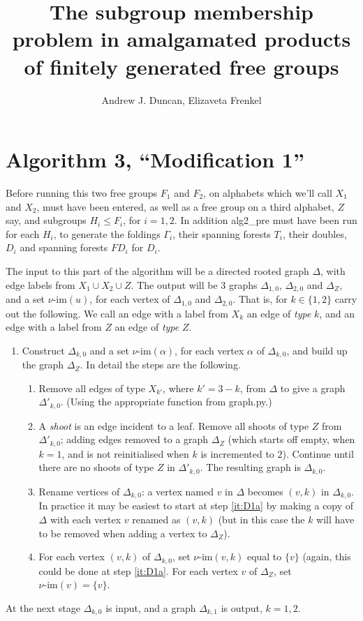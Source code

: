 \documentclass[a4paper,12pt]{article}
\title{The subgroup membership problem in amalgamated products of 
finitely generated free groups
}
\author{Andrew J. Duncan, Elizaveta Frenkel}
\renewcommand{\a}{\alpha }
\newcommand{\G}{\Gamma }
\newcommand{\D}{\Delta }
\newcommand{\vim}{\nu\textrm{-im}}
\numberwithin{equation}{section}
\numberwithin{figure}{section}
\newcommand{\be}{\begin{enumerate}}
\newcommand{\ee}{\end{enumerate}}
\begin{document}
\section{Algorithm 3, ``Modification 1''}
Before running this two free groups $F_1$ and $F_2$, on alphabets which we'll call
$X_1$ and $X_2$, must have been entered, as well as a free group on a third alphabet,
$Z$ say, and subgroups $H_i\le F_i$, for $i=1,2$. In addition alg2\_pre must have
been run for each $H_i$, to generate  the foldings $\G_i$, their spanning forests
$T_i$, their doubles, $D_i$ and spanning forests $FD_i$ for $D_i$. 

The input to this part of the algorithm will be a directed rooted 
graph $\D$, with edge labels from $X_1\cup X_2\cup Z$. The output
will be 3 graphs $\D_{1,0}$, $\D_{2,0}$ and $\D_Z$, and 
a set $\vim(u)$, for each vertex of $\D_{1,0}$ and $\D_{2,0}$. That is, for  $k\in \{1,2\}$ carry out the following. We call an edge with a label from $X_k$ an edge of \emph{type} $k$, and an edge with a label from $Z$ an edge
of \emph{type} $Z$. 
\be[{D}1]
\item\label{it:D1} Construct $\D_{k,0}$ and   
a set $\vim(\a)$, for each vertex  $\a$ of $\D_{k,0}$, and build up
the graph $\D_Z$. In detail the steps are
the following. 
\be 
\item\label{it:D1a} Remove all edges of type $X_{k'}$, where $k'=3-k$, from $\D$ to give a graph $\D'_{k,0}$. (Using the appropriate function from  graph.py.)
\item\label{it:D1b} A \emph{shoot} is an edge incident to a leaf. Remove all shoots
of type $Z$ from $\D'_{k,0}$; adding 
edges removed to  a graph $\D_Z$ (which starts off empty, when $k=1$, and  
is not reinitialised when $k$ is incremented to $2$). Continue 
until there are no shoots of type $Z$ in $\D'_{k,0}$.  The resulting graph
is $\D_{k,0}$.  
\item\label{it:D1c}  Rename vertices of $\D_{k,0}$: 
a vertex named $v$  in $\D$ becomes
$(v,k)$ in $\D_{k,0}$. In practice it may be easiest to start at 
step \ref{it:D1a} by making a copy of $\D$ with each vertex $v$ renamed
as $(v,k)$ (but in this case the $k$ will have to be removed when
adding a vertex to $\D_Z$). 
\item\label{it:D1d} For each  vertex $(v,k)$  of $\D_{k,0}$,  set 
  $\vim(v,k)$ equal to $\{v\}$ (again, this could be done at 
step \ref{it:D1a}.  For each vertex $v$ of $\D_Z$, 
set $\vim(v)=\{v\}$. 
\ee
\ee
At the next stage $\D_{k,0}$ is input, and  a graph $\D_{k,1}$ is 
output, $k=1,2$. 
\end{document}
